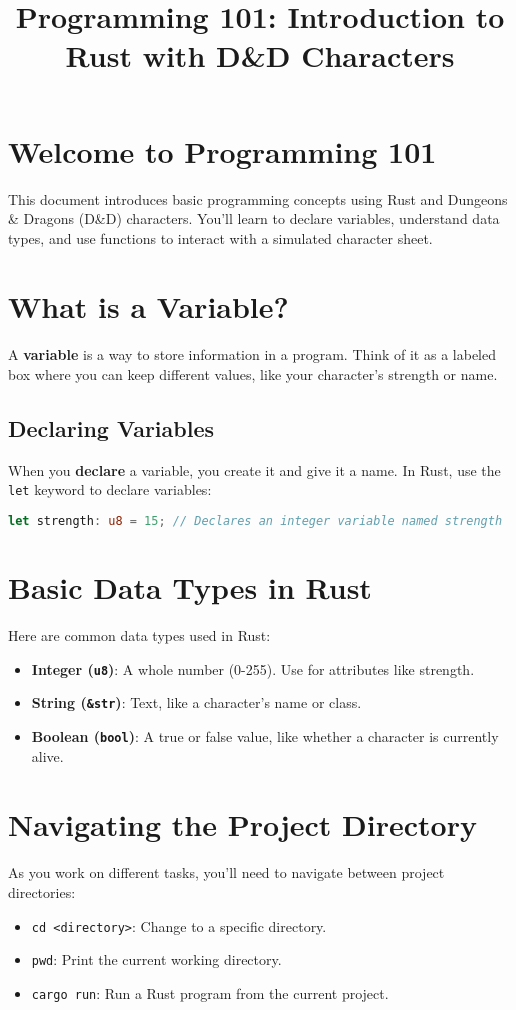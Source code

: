 \documentclass{article}
\title{Programming 101: Introduction to Rust with D\&D Characters}
\author{}
\date{}
\begin{document}
	
	\maketitle
	
	\section*{Welcome to Programming 101}
	This document introduces basic programming concepts using Rust and Dungeons \& Dragons (D\&D) characters. You'll learn to declare variables, understand data types, and use functions to interact with a simulated character sheet.
	
	\section*{What is a Variable?}
	A \textbf{variable} is a way to store information in a program. Think of it as a labeled box where you can keep different values, like your character’s strength or name.
	
	\subsection*{Declaring Variables}
	When you \textbf{declare} a variable, you create it and give it a name. In Rust, use the \texttt{let} keyword to declare variables:
	\begin{lstlisting}[language=Rust]
		let strength: u8 = 15; // Declares an integer variable named strength
	\end{lstlisting}
	
	\section*{Basic Data Types in Rust}
	Here are common data types used in Rust:
	\begin{itemize}
		\item \textbf{Integer (\texttt{u8})}: A whole number (0-255). Use for attributes like strength.
		\item \textbf{String (\texttt{\&str})}: Text, like a character’s name or class.
		\item \textbf{Boolean (\texttt{bool})}: A true or false value, like whether a character is currently alive.
	\end{itemize}
	
	\section*{Navigating the Project Directory}
	As you work on different tasks, you’ll need to navigate between project directories:
	\begin{itemize}
		\item \texttt{cd <directory>}: Change to a specific directory.
		\item \texttt{pwd}: Print the current working directory.
		\item \texttt{cargo run}: Run a Rust program from the current project.
	\end{itemize}
	
\end{document}
